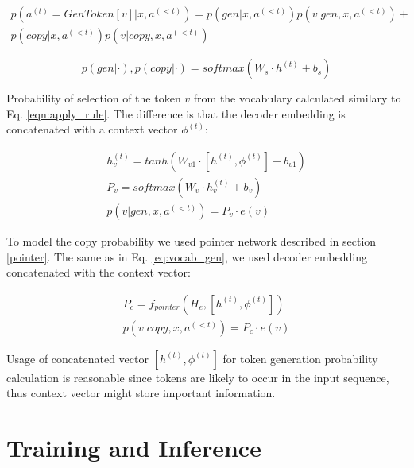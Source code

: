 \begin{equation}
\begin{gathered}
    p(a^{(t)} = GenToken[v]|x,a^{(<t)}) = p(gen|x, a^{(<t)}) p(v|gen, x, a^{(<t)}) + \\
    p(copy|x, a^{(<t)}) p(v|copy, x, a^{(<t)})
\end{gathered}
\end{equation}

\begin{equation}
    p(gen|\cdot), p(copy|\cdot) = softmax(W_s\cdot h^{(t)} + b_s)
\end{equation}

Probability of selection of the token $v$ from the vocabulary calculated similary to Eq. \ref{eqn:apply_rule}. The difference is that the decoder embedding is concatenated with a context vector $\phi^{(t)}$:

\begin{equation}
\begin{gathered}
    h^{(t)}_v = tanh(W _{v1}\cdot [h^{(t)}, \phi^{(t)}] + b_{v1}) \\
    P_v = softmax(W_v\cdot h^{(t)}_v  + b_v) \\
    p(v|gen, x, a^{(<t)}) = P_v\cdot e(v)
\end{gathered}
\label{eq:vocab_gen}
\end{equation}

To model the copy probability we used pointer network \parencite{Vinyals2015} described in section \ref{pointer}. The same as in Eq. \ref{eq:vocab_gen}, we used decoder embedding concatenated with the context vector:

\begin{equation}
\begin{gathered}
    P_c = f_{pointer}(H_e, [h^{(t)}, \phi^{(t)}]) \\
    p(v|copy, x, a^{(<t)}) = P_c \cdot e(v)
\end{gathered}
\end{equation}

Usage of concatenated vector $[h^{(t)}, \phi^{(t)}]$ for token generation probability calculation is reasonable since tokens are likely to occur in the input sequence, thus context vector might store important information.

\section{Training and Inference}

